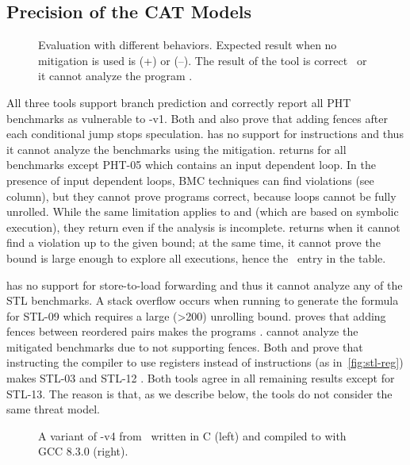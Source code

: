 \documentclass[conference]{IEEEtran}
\begin{document}
\subsection{Precision of the CAT Models}
\label{sec:prec}

\begin{figure}[h]
  
  \caption{Evaluation with different \spectre behaviors. Expected result when no mitigation is used is \safe ({\mygreen +}) or \unsafe ({\red --}). The result of the tool is correct \gtick\ or it cannot analyze the program \danger.}
  \label{table:all}
\end{figure}

All three tools support branch prediction and correctly report all PHT benchmarks as vulnerable to \spectre-v1.
Both \zombmc and \spectector also prove that adding fences after each conditional jump stops speculation. 
\binsec has no support for \fence instructions and thus it cannot analyze the benchmarks using the mitigation. 
\zombmc returns \safe for all benchmarks except PHT-05 which contains an input dependent loop.
In the presence of input dependent loops, BMC techniques can find violations (see \none column), but they cannot prove programs correct, because loops cannot be fully unrolled.
While the same limitation applies to \spectector and \binsec (which are based on symbolic execution), they return \safe even if the analysis is incomplete.
\zombmc returns \unknown when it cannot find a violation up to the given bound; at the same time, it cannot prove the bound is large enough to explore all executions, hence the \danger\ entry in the table.

\spectector has no support for store-to-load forwarding and thus it cannot analyze any of the STL benchmarks.
A stack overflow occurs when running \zombmc to generate the formula for STL-09 which requires a large (\textgreater 200) unrolling bound. %
\zombmc proves that adding fences between reordered pairs makes the programs \safe.
\binsec cannot analyze the mitigated benchmarks due to not supporting fences.
Both \zombmc and \binsec prove that instructing the compiler to use registers instead of \store instructions (as in~\autoref{fig:stl-reg}) makes STL-03 and STL-12 \safe.
Both tools agree in all remaining results except for STL-13.
The reason is that, as we describe below, the tools do not consider the same threat model.

\begin{figure*}[]
\centering
  \scalebox{.8}{}
  \caption{A variant of \spectre-v4 from~\cite{spectrev4-litmus} written in C (left) and compiled to \xes with GCC 8.3.0 (right).}
  \label{fig:case13}
\end{figure*}
\end{document}
